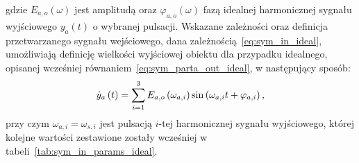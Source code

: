 gdzie $E_{a,o}(\omega)$ jest amplitudą oraz $\varphi_{a,o}(\omega)$ fazą idealnej harmonicznej sygnału wyjściowego $y_{a}(t)$ o wybranej pulsacji.
Wskazane zależności oraz definicja przetwarzanego sygnału wejściowego, dana zależnością~\eqref{eq:sym_in_ideal}, umożliwiają definicję wielkości wyjściowej obiektu dla przypadku idealnego, opisanej wcześniej równaniem~\eqref{eq:sym_parta_out_ideal}, w następujący sposób:
\begin{equation}
\dot{y}_{a} \left(t\right) = \sum _{i=1} ^{3} E_{a,o} \left(\omega_{a,i}\right) \sin \left(\omega_{a,i} t + \varphi_{a,i}\right) \label{eq:sym_parta_out_ideal_sum},
\end{equation}
przy czym $\omega_{a,i} = \omega_{s,i}$ jest pulsacją $i$-tej harmonicznej sygnału wyjściowego, której kolejne wartości zestawione zostały wcześniej w tabeli~\ref{tab:sym_in_params_ideal}.

